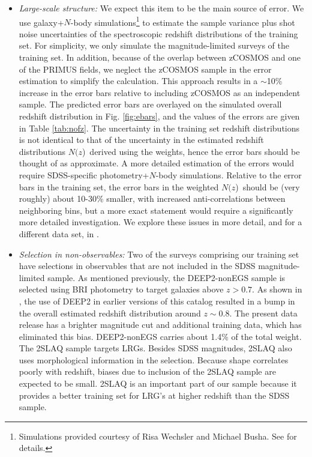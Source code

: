 \documentclass[preprint]{aastex}
\newcommand{\nofz}{$N(z$)}
\begin{document}
\begin{itemize}

\item {\it Large-scale structure: } We expect this item to be the main source of
error.  We use galaxy+$N$-body simulations\footnote{Simulations provided courtesy of Risa Wechsler and
Michael Busha. See \cite{bushasimulations} for details.}
 to estimate the sample variance plus shot
noise uncertainties of the spectroscopic redshift distributions of the training
set.  For simplicity, we only simulate the magnitude-limited surveys of the
training set.  In addition, because of the overlap between zCOSMOS and one of
the PRIMUS fields, we neglect the zCOSMOS sample in the error estimation to
simplify the calculation.  This approach results in a $\sim$10\% increase in the error
bars relative to including zCOSMOS as an independent sample.  The predicted
error bars are overlayed on the simulated overall redshift
distribution in Fig.
\ref{fig:ebars}, and the values of the errors are given in Table \ref{tab:nofz}. The
uncertainty in the training set redshift distributions is not identical to that
of the uncertainty in the estimated redshift distributions \nofz\ derived using
the weights, hence the error bars should be thought of as approximate.
A more detailed estimation of the errors would require SDSS-specific
photometry+$N$-body simulations.  Relative to the error bars in the
training set, the error bars in the weighted \nofz\ should be (very roughly)
about 10-30\% smaller, with increased anti-correlations between neighboring
bins, but a more exact statement would require a significantly more
detailed investigation.
We explore these issues in more detail, and for a different data set,
in \citet{CunhaPhotozLSS11}.


\item {\it Selection in non-observables: } Two of the surveys comprising our
training set have selections in observables that are not included in the SDSS
magnitude-limited sample.  As mentioned previously, the DEEP2-nonEGS sample is
selected using BRI photometry to target galaxies above $z>0.7$.  As shown in
\citet{CunhaPhotoz09}, the use of DEEP2 in earlier versions of this catalog
resulted in a bump in the overall estimated redshift distribution around $z\sim
0.8$.  The present data release has a brighter magnitude cut and additional
training data, which has eliminated this bias.  
DEEP2-nonEGS carries about 1.4\% of the total weight.  The 2SLAQ sample targets
LRGs.  Besides SDSS magnitudes, 2SLAQ also uses morphological information in the
selection.  Because shape correlates poorly with redshift, biases due to inclusion of the
2SLAQ sample are expected to be small.  2SLAQ is an important part of our
sample because it provides a better training set for LRG's at higher redshift
than the SDSS sample.


\end{itemize}
\end{document}
